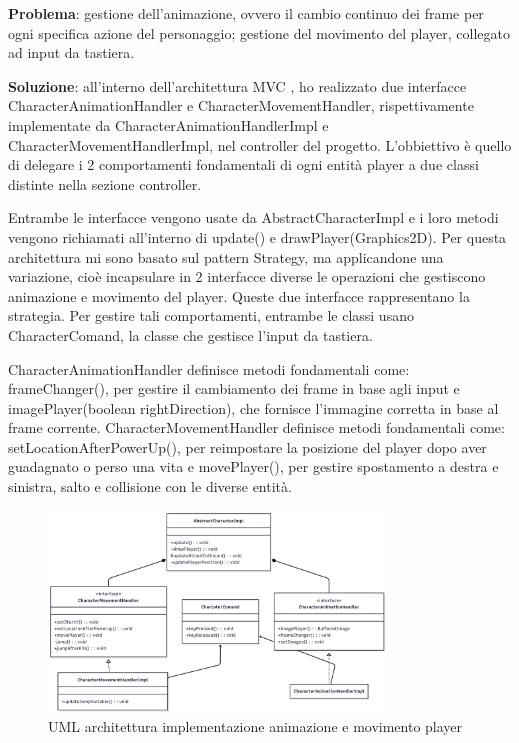 \documentclass[a4paper,12pt]{report}
\begin{document}
\textbf{Problema}: gestione dell'animazione, ovvero il cambio continuo dei frame per ogni specifica azione del personaggio; 
gestione del movimento del player, collegato ad input da tastiera.\vspace{1cm}

\textbf{Soluzione}: all'interno dell'architettura MVC , ho realizzato due interfacce CharacterAnimationHandler e 
CharacterMovementHandler, rispettivamente implementate da CharacterAnimationHandlerImpl e CharacterMovementHandlerImpl, nel controller 
del progetto. L'obbiettivo è quello di delegare i 2 comportamenti fondamentali di ogni entità player a due classi distinte nella sezione 
controller.

Entrambe le interfacce vengono usate da AbstractCharacterImpl e i loro metodi vengono richiamati all'interno di update() 
e drawPlayer(Graphics2D).
Per questa architettura mi sono basato sul pattern Strategy, ma applicandone una variazione, cioè incapsulare in 2 interfacce diverse 
le operazioni che gestiscono animazione e movimento del player. Queste due interfacce rappresentano la strategia. Per gestire 
tali comportamenti, entrambe le classi usano CharacterComand, la classe che gestisce l'input da tastiera.

CharacterAnimationHandler definisce metodi fondamentali come: frameChanger(), per gestire il cambiamento dei frame in base agli input 
e imagePlayer(boolean rightDirection), che fornisce l'immagine corretta in base al frame corrente.
CharacterMovementHandler definisce metodi fondamentali come: setLocationAfterPowerUp(), per reimpostare la posizione del player
dopo aver guadagnato o perso una vita e movePlayer(), per gestire spostamento a destra e sinistra, salto e collisione con le diverse 
entità.

\begin{figure}[H]
    \centering
    \includegraphics[width=0.8\textwidth]{resources/playerAction.png}
    \caption{UML architettura implementazione animazione e movimento player}
    \label{fig:2.2}
\end{figure}
\end{document}

